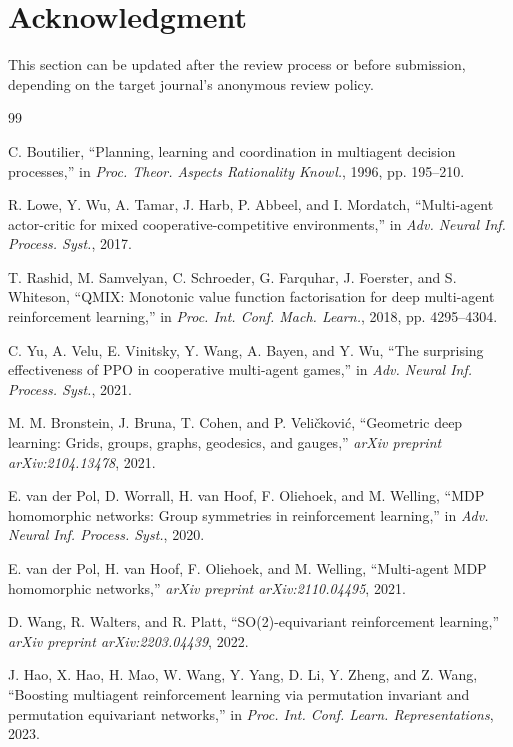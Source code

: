 \documentclass[lettersize,journal]{IEEEtran}
\begin{document}
\section*{Acknowledgment}
This section can be updated after the review process or before submission, depending on the target journal's anonymous review policy.

\begin{thebibliography}{99}

C. Boutilier, ``Planning, learning and coordination in multiagent decision processes,'' in \emph{Proc. Theor. Aspects Rationality Knowl.}, 1996, pp. 195--210.

R. Lowe, Y. Wu, A. Tamar, J. Harb, P. Abbeel, and I. Mordatch, ``Multi-agent actor-critic for mixed cooperative-competitive environments,'' in \emph{Adv. Neural Inf. Process. Syst.}, 2017.

T. Rashid, M. Samvelyan, C. Schroeder, G. Farquhar, J. Foerster, and S. Whiteson, ``QMIX: Monotonic value function factorisation for deep multi-agent reinforcement learning,'' in \emph{Proc. Int. Conf. Mach. Learn.}, 2018, pp. 4295--4304.

C. Yu, A. Velu, E. Vinitsky, Y. Wang, A. Bayen, and Y. Wu, ``The surprising effectiveness of PPO in cooperative multi-agent games,'' in \emph{Adv. Neural Inf. Process. Syst.}, 2021.

M. M. Bronstein, J. Bruna, T. Cohen, and P. Veli\v{c}kovi\'{c}, ``Geometric deep learning: Grids, groups, graphs, geodesics, and gauges,'' \emph{arXiv preprint arXiv:2104.13478}, 2021.

E. van der Pol, D. Worrall, H. van Hoof, F. Oliehoek, and M. Welling, ``MDP homomorphic networks: Group symmetries in reinforcement learning,'' in \emph{Adv. Neural Inf. Process. Syst.}, 2020.

E. van der Pol, H. van Hoof, F. Oliehoek, and M. Welling, ``Multi-agent MDP homomorphic networks,'' \emph{arXiv preprint arXiv:2110.04495}, 2021.

D. Wang, R. Walters, and R. Platt, ``SO(2)-equivariant reinforcement learning,'' \emph{arXiv preprint arXiv:2203.04439}, 2022.

J. Hao, X. Hao, H. Mao, W. Wang, Y. Yang, D. Li, Y. Zheng, and Z. Wang, ``Boosting multiagent reinforcement learning via permutation invariant and permutation equivariant networks,'' in \emph{Proc. Int. Conf. Learn. Representations}, 2023.


\end{thebibliography}
\end{document}

